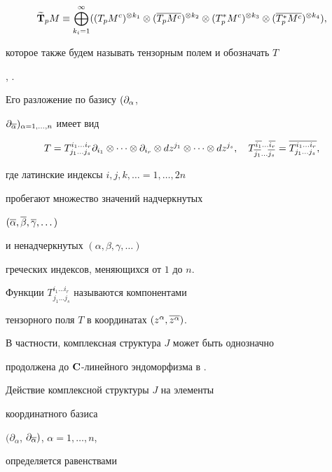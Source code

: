 $$


\widetilde{\bold T}_p M \equiv \bigoplus \limits^{\infty}_{k_i=1}


( (T_p M^c)^{\otimes k_1}\otimes (\ol{T_p M^c})^{\otimes k_2}


\otimes (T^*_p M^c)^{\otimes k_3}\otimes


(\ol{T^*_p M^c})^{\otimes k_4} ),


$$


которое также будем называть тензорным полем и обозначать $T$


\cite{kobn}, \cite{well}.


Его разложение по базису $(\partial_{\alpha}$,


$\partial_{\overline\alpha})_{\alpha=1,\dotsc,n}$ имеет вид


$$


T = T^{i_1\dotsc i_{r}}_{j_1\dotsc j_s} \partial_{i_1} \otimes \dotsb \otimes


\partial_{i_{r}}


\otimes dz^{j_1} \otimes\dotsb \otimes dz^{j_s}, \quad


T^{\ol{i_1}\dotsc\ol{i_{r}}}_{\ol{j_1}\dotsc \ol{j_s}} =


\ol{T^{i_1 \dotsc i_{r}}_{j_1\dotsc j_s}},


$$


где латинские индексы $i,j,k,\dotsc = 1,\dotsc,2n$


пробегают множество значений надчеркнутых


$(\overline \alpha, \overline \beta,\overline \gamma,\dotsc)$


и ненадчеркнутых $(\alpha, \beta,\gamma,\dotsc)$


греческих индексов, меняющихся от $1$ до $n$.


Функции $T^{i_1\dotsc i_r}_{j_1\dotsc j_s}$ называются компонентами


тензорного поля $T$ в координатах $(z^\alpha, \overline{z^\alpha})$.





В частности, комплексная структура $J$ может быть однозначно


продолжена до ${\bold C}$-линейного эндоморфизма в \tmc.


Действие комплексной структуры $J$ на элементы


координатного базиса


$(\partial_{\alpha}$, $\partial_{\overline \alpha})$, ${\alpha=1,\dotsc,n}$,


определяется равенствами


